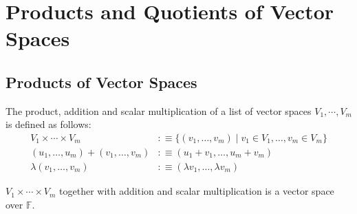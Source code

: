\section{Products and Quotients of Vector Spaces}
\subsection{Products of Vector Spaces}

\setcounter{thm}{86}
\begin{mydef} 
  The product, addition and scalar multiplication of a list of vector spaces $V_1, \cdots, V_m$ is defined as follows:
  \begin{equation}
    \begin{aligned}
      V_1 \times \cdots \times V_m &:\equiv \{ (v_1, \dots, v_m) \mid v_1 \in V_1, \dots, v_m \in V_m\} \\
      (u_1, \dots, u_m) + (v_1, \dots, v_m) &:\equiv (u_1+v_1, \dots, u_m+v_m) \\
      \lambda (v_1, \dots, v_m) &:\equiv (\lambda v_1, \dots, \lambda v_m)
    \end{aligned}
  \end{equation}
\end{mydef}

\setcounter{thm}{88}
\begin{thm} 
  $V_1 \times \cdots \times V_m$ together with addition and scalar multiplication is a vector space over $\mathbb{F}$.
\end{thm}

